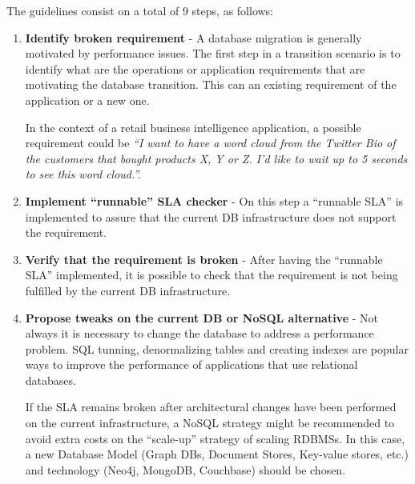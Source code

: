 The guidelines consist on a total of 9 steps, as follows:


\begin{enumerate}
   \item{\textbf{Identify broken requirement} - A database migration is generally motivated by performance issues. The first step in a transition scenario is to identify what are the operations or application requirements that are motivating the database transition. This can an existing requirement of the application or a new one.

   In the context of a retail business intelligence application, a possible requirement could be \textit{``I want to have a word cloud from the Twitter Bio of the customers that bought products X, Y or Z. I'd like to wait up to 5 seconds to see this word cloud.''.}}
   \item{\textbf{Implement ``runnable'' SLA checker} - On this step a ``runnable SLA'' is implemented to assure that the current DB infrastructure does not support the requirement. }
   \item{\textbf{Verify that the requirement is broken} - After having the ``runnable SLA'' implemented, it is possible to check that the requirement is not being fulfilled by the current DB infrastructure.}
   \item{\textbf{Propose tweaks on the current DB or NoSQL alternative} - Not always it is necessary to change the database to address a performance problem. SQL tunning, denormalizing tables and creating indexes are popular ways to improve the performance of applications that use relational databases.

   If the SLA remains broken after architectural changes have been performed on the current infrastructure, a NoSQL strategy might be recommended to avoid extra costs on the ``scale-up'' strategy of scaling RDBMSs. In this case, a new Database Model (Graph DBs, Document Stores, Key-value stores, etc.) and technology (Neo4j, MongoDB, Couchbase) should be chosen. 
   }


\end{enumerate}
